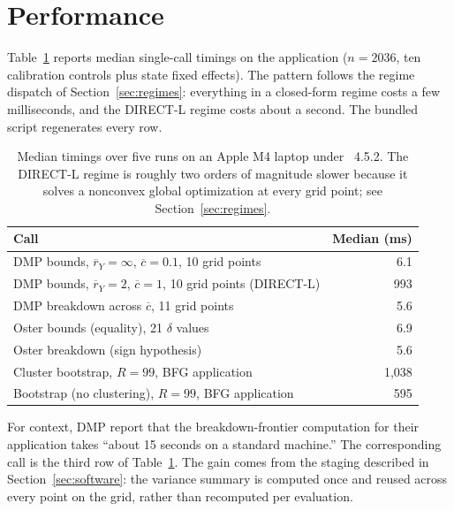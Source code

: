 \documentclass[article]{jss}\usepackage[]{graphicx}\usepackage[]{xcolor}
\newcommand{\rybar}{\ensuremath{\overline{r}_Y}}
\newcommand{\cbar}{\ensuremath{\overline{c}}}
\begin{document}
\section{Performance}\label{sec:bench}

Table~\ref{tab:timing} reports median single-call timings on the
\citet{BFG2020} application ($n = 2036$, ten calibration controls plus
state fixed effects). The pattern follows the regime dispatch of
Section~\ref{sec:regimes}: everything in a closed-form regime costs a few
milliseconds, and the DIRECT-L regime costs about a second. The bundled
script  regenerates every row.

\begin{table}[t!]
\centering
\begin{tabular}{lr}
\toprule
Call & Median (ms) \\
\midrule
DMP bounds, $\rybar = \infty$, $\cbar = 0.1$, 10 grid points & 6.1 \\
DMP bounds, $\rybar = 2$, $\cbar = 1$, 10 grid points (DIRECT-L) & 993 \\
DMP breakdown across $\cbar$, 11 grid points & 5.6 \\
Oster bounds (equality), 21 $\delta$ values & 6.9 \\
Oster breakdown (sign hypothesis) & 5.6 \\
Cluster bootstrap, $R=99$, BFG application & 1{,}038 \\
Bootstrap (no clustering), $R=99$, BFG application & 595 \\
\bottomrule
\end{tabular}
\caption{Median timings over five runs on an Apple M4 laptop under
~4.5.2. The DIRECT-L regime is roughly two orders of magnitude
slower because it solves a nonconvex global optimization at every grid
point; see Section~\ref{sec:regimes}.}
\label{tab:timing}
\end{table}

For context, DMP report that the breakdown-frontier computation for their
application takes ``about 15 seconds on a standard machine.'' The
corresponding  call is the third row of
Table~\ref{tab:timing}. The gain comes from the staging described in
Section~\ref{sec:software}: the variance summary is computed once and
reused across every point on the grid, rather than recomputed per
evaluation.
\end{document}

